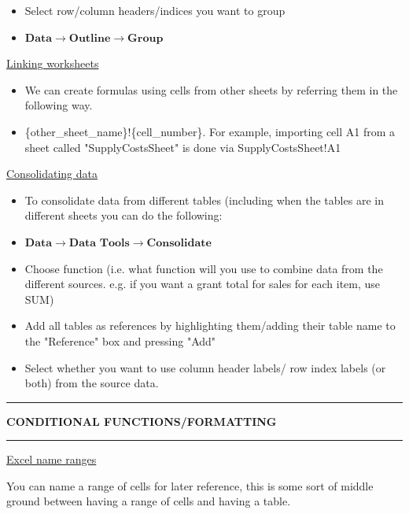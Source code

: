 \documentclass[8pt]{extarticle}
\newcommand{\heading}[1]{%
    \noindent
    \rule{\linewidth}{0.4pt}
    \begin{center}
        \vspace{-1ex}
        \textbf{#1}        
        \vspace{-2.5ex}
    \end{center}
    \rule{\linewidth}{0.4pt}
}
\begin{document}
\begin{multicols}{3}
\begin{itemize}
    \item Select row/column headers/indices you want to group 
    \item $\textbf{Data} \rightarrow \textbf{Outline} \rightarrow\textbf{Group}$
\end{itemize}

\begin{center}
    \underline{Linking worksheets}
\end{center}

\begin{itemize}
    \item We can create formulas using cells from other sheets by referring them in the following way.
    \item \{other\_sheet\_name\}!\{cell\_number\}. For example, importing cell A1 from a sheet called "SupplyCostsSheet" is done via SupplyCostsSheet!A1
\end{itemize}

\begin{center}
    \underline{Consolidating data}
\end{center}

\begin{itemize}
    \item To consolidate data from different tables (including when the tables are in different sheets you can do the following:
    \item $\textbf{Data} \rightarrow \textbf{Data Tools} \rightarrow \textbf{Consolidate}$
    \item Choose function (i.e. what function will you use to combine data from the different sources. e.g. if you want a grant total for sales for each item, use SUM)
    \item Add all tables as references by highlighting them/adding their table name to the "Reference" box and pressing "Add"
    \item Select whether you want to use column header labels/ row index labels (or both) from the source data.
\end{itemize}

\heading{CONDITIONAL FUNCTIONS/FORMATTING}

\begin{center}
    \underline{Excel name ranges}
\end{center}

You can name a range of cells for later reference, this is some sort of middle ground between having a range of cells and having a table. 


\end{multicols}
\end{document}
